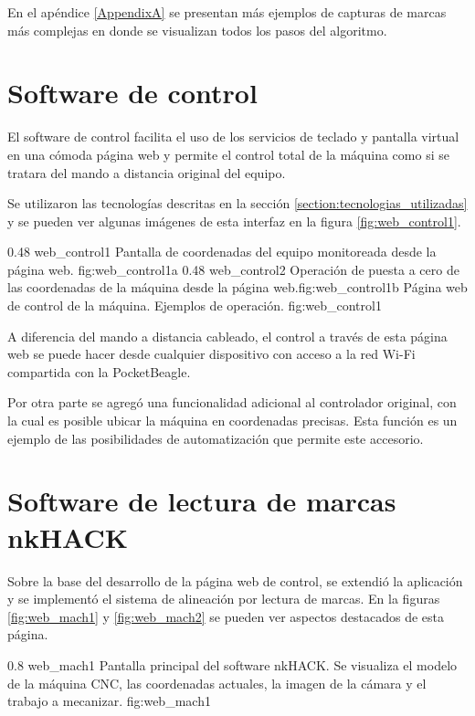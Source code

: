          En el apéndice \ref{AppendixA} se presentan más ejemplos de capturas de marcas más complejas en donde se visualizan todos los pasos del algoritmo.\par

\section{Software de control}

   El software de control facilita el uso de los servicios de teclado y pantalla virtual en una cómoda página web y permite el control total de la máquina como si se tratara del mando a distancia original del equipo.\par
   Se utilizaron las tecnologías descritas en la sección \ref{section:tecnologias_utilizadas} y se pueden ver algunas imágenes de esta interfaz en la figura \ref{fig:web_control1}.

\subfigab 
{0.48} {web_control1} {Pantalla de coordenadas del equipo monitoreada desde la página web.} {fig:web_control1a}
{0.48} {web_control2} {Operación de puesta a cero de las coordenadas de la máquina desde la página web.}{fig:web_control1b}
      {Página web de control de la máquina. Ejemplos de operación.}
      {fig:web_control1}

   A diferencia del mando a distancia cableado, el control a través de esta página web se puede hacer desde cualquier dispositivo con acceso a la red Wi-Fi compartida con la PocketBeagle.\par
   Por otra parte se agregó una funcionalidad adicional al controlador original, con la cual es posible ubicar la máquina en coordenadas precisas. Esta función es un ejemplo de las posibilidades de automatización que permite este accesorio.\par

\section{Software de lectura de marcas nkHACK}

Sobre la base del desarrollo de la página web de control, se extendió la aplicación y se implementó el sistema de alineación por lectura de marcas.
   En la figuras \ref{fig:web_mach1} y \ref{fig:web_mach2} se pueden ver aspectos destacados de esta página.

\subfiga
{0.8} {web_mach1} {Pantalla principal del software nkHACK. Se visualiza el modelo de la máquina CNC, las coordenadas actuales, la imagen de la cámara y el trabajo a mecanizar.} {fig:web_mach1}

